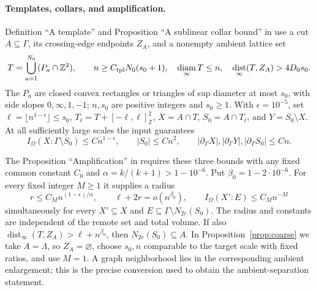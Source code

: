 \documentclass[11pt]{article}
\numberwithin{equation}{section}
\theoremstyle{definition}
\theoremstyle{remark}
\DeclareMathOperator{\dist}{dist}
\DeclareMathOperator{\diam}{diam}
\begin{document}
\paragraph{Templates, collars, and amplification.}
Definition ``A template'' and Proposition ``A sublinear collar bound'' in
\cite[Section~9]{RepoAreaLaw} use a cut $A\subseteq\Gamma$, its crossing-edge
endpoints $Z_A$, and a nonempty ambient lattice set
\[
 T=\bigcup_{a=1}^{N_0}(P_a\cap\mathbb Z^2),\qquad
 n\ge C_{\rm tpl}N_0(s_0+1),\quad \diam_\infty T\le n,
 \quad \dist_\infty(T,Z_A)>4D_0s_0.
\]
The $P_a$ are closed convex rectangles or triangles of sup diameter at most
$s_0$, with side slopes $0,\infty,1,-1$; $n,s_0$ are positive integers and
$s_0\ge1$. With $\epsilon=10^{-5}$, set
$\ell=\lfloor n^{1-\epsilon}\rfloor\le s_0$,
$T_\ell=T+[-\ell,\ell]^2_{\mathbb Z}$, $X=A\cap T$,
$S_0=A\cap T_\ell$, and $Y=S_0\setminus X$.
At all sufficiently large scales the input guarantees
\[
 I_\Omega(X:\Gamma\setminus S_0)\le Cn^{1-\epsilon},\qquad
 |S_0|\le Cn^2,\qquad
 |\partial_\Gamma X|,|\partial_\Gamma Y|,|\partial_\Gamma S_0|\le Cn.
\]

The Proposition ``Amplification'' in \cite[Section~10]{RepoAreaLaw}
requires these three bounds with any fixed common constant $C_0$ and
$\alpha=k/(k+1)>1-10^{-6}$. Put $\beta_0=1-2\cdot10^{-6}$.
For every fixed integer $M\ge1$ it supplies a radius
\[
 r\le C_M n^{(1-\epsilon)/\alpha},\qquad
 \ell+2r=o(n^{\beta_0}),\qquad
 I_\Omega(X':E)\le C_M n^{-M}
\]
simultaneously for every $X'\subseteq X$ and
$E\subseteq\Gamma\setminus N_{2r}(S_0)$. The radius and constants are
independent of the remote set and total volume. If also
$\dist_\infty(T,Z_A)>\ell+n^{\beta_0}$, then
$N_{2r}(S_0)\subseteq A$. In Proposition~\ref{prop:coarse} we take
$A=\Lambda$, so $Z_A=\varnothing$, choose $s_0,n$ comparable to the target
scale with fixed ratios, and use $M=1$. A graph neighborhood lies in the
corresponding ambient enlargement; this is the precise conversion used to
obtain the ambient-separation statement.
\end{document}
